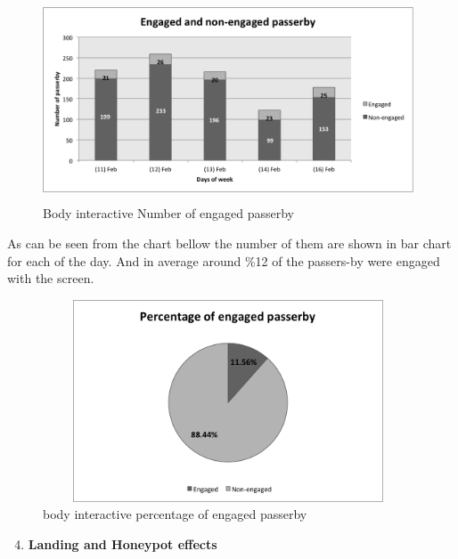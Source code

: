 \begin{enumerate}
\begin{figure}[H]
    \centering
    \includegraphics[width=110mm,height=60mm]{Figures/8/body_inter_findings/body_inter_engage_day}
    \caption{Body interactive Number of engaged passerby}%
    \label{fig:bodyengagedandengagedby}%
\end{figure}
As can be seen from the chart bellow the number of them are shown in bar chart for each of the day. And in average around \%12 of the passers-by were engaged with the screen. 

\begin{figure}[H]
    \centering
    \includegraphics[width=110mm,height=60mm]{Figures/8/body_inter_findings/body_eng_percentage}
    \caption{body interactive percentage of engaged passerby}%
    \label{fig:bodyengagedpasserbypercentage}%
\end{figure}


\end{enumerate}


\newpage
\begin{enumerate}
\setcounter{enumi}{3}
\item \textbf{Landing and Honeypot effects}
\end{enumerate}

